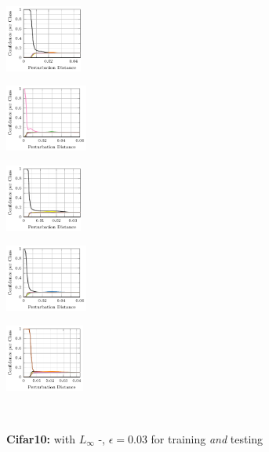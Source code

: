 \begin{figure}[t]
    \\
    \begin{subfigure}{0.19\textwidth}
        \includegraphics[height=2.2cm]{fig_svhn_ours10_5_adversarial}
    \end{subfigure}
    \begin{subfigure}{0.19\textwidth}
        \includegraphics[height=2.2cm]{fig_svhn_ours10_6_adversarial}
    \end{subfigure}
    \begin{subfigure}{0.19\textwidth}
        \includegraphics[height=2.2cm]{fig_svhn_ours10_7_adversarial}
    \end{subfigure}
    \begin{subfigure}{0.19\textwidth}
        \includegraphics[height=2.2cm]{fig_svhn_ours10_8_adversarial}
    \end{subfigure}
    \begin{subfigure}{0.19\textwidth}
        \includegraphics[height=2.2cm]{fig_svhn_ours10_9_adversarial}
    \end{subfigure}
    \\[4px]
    \begin{subfigure}{1\textwidth}
        \centering
        \textbf{Cifar10:} \textbf{\AdvTrain} with $L_\infty$ \PGD-\FConf, $\epsilon = 0.03$ for training \emph{and} testing

\end{subfigure}
\end{figure}
